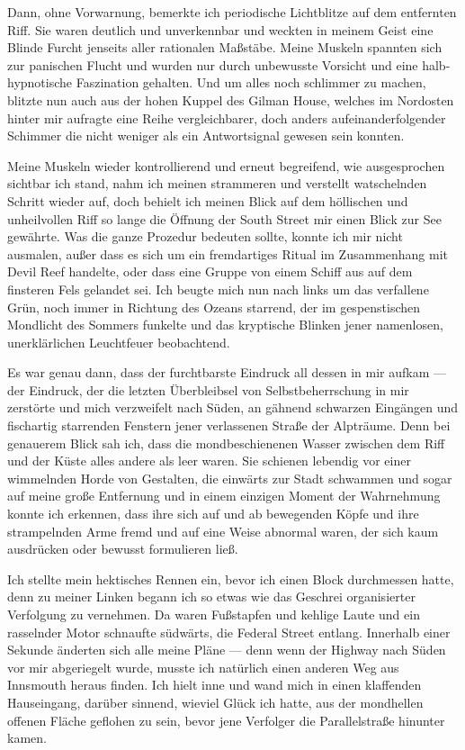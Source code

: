 Dann, ohne Vorwarnung, bemerkte ich periodische Lichtblitze auf dem entfernten Riff. Sie waren deutlich und unverkennbar und weckten in meinem Geist eine Blinde Furcht jenseits aller rationalen Maßstäbe. Meine Muskeln spannten sich zur panischen Flucht und wurden nur durch unbewusste Vorsicht und eine halb-hypnotische Faszination gehalten. Und um alles noch schlimmer zu machen, blitzte nun auch aus der hohen Kuppel des Gilman House, welches im Nordosten hinter mir aufragte eine Reihe vergleichbarer, doch anders aufeinanderfolgender Schimmer die nicht weniger als ein Antwortsignal gewesen sein konnten.

Meine Muskeln wieder kontrollierend und erneut begreifend, wie ausgesprochen sichtbar ich stand, nahm ich meinen strammeren und verstellt watschelnden Schritt wieder auf, doch behielt ich meinen Blick auf dem höllischen und unheilvollen Riff so lange die Öffnung der South Street mir einen Blick zur See gewährte. Was die ganze Prozedur bedeuten sollte, konnte ich mir nicht ausmalen, außer dass es sich um ein fremdartiges Ritual im Zusammenhang mit Devil Reef handelte, oder dass eine Gruppe von einem Schiff aus auf dem finsteren Fels gelandet sei. Ich beugte mich nun nach links um das verfallene Grün, noch immer in Richtung des Ozeans starrend, der im gespenstischen Mondlicht des Sommers funkelte und das kryptische Blinken jener namenlosen, unerklärlichen Leuchtfeuer beobachtend.

Es war genau dann, dass der furchtbarste Eindruck all dessen in mir aufkam --- der Eindruck, der die letzten Überbleibsel von Selbstbeherrschung in mir zerstörte und mich verzweifelt nach Süden, an gähnend schwarzen Eingängen und fischartig starrenden Fenstern jener verlassenen Straße der Alpträume. Denn bei genauerem Blick sah ich, dass die mondbeschienenen Wasser zwischen dem Riff und der Küste alles andere als leer waren. Sie schienen lebendig vor einer wimmelnden Horde von Gestalten, die einwärts zur Stadt schwammen und sogar auf meine große Entfernung und in einem einzigen Moment der Wahrnehmung konnte ich erkennen, dass ihre sich auf und ab bewegenden Köpfe und ihre strampelnden Arme fremd und auf eine Weise abnormal waren, der sich kaum ausdrücken oder bewusst formulieren ließ.

Ich stellte mein hektisches Rennen ein, bevor ich einen Block durchmessen hatte, denn zu meiner Linken begann ich so etwas wie das Geschrei organisierter Verfolgung zu vernehmen. Da waren Fußstapfen und kehlige Laute und ein rasselnder Motor schnaufte südwärts, die Federal Street entlang. Innerhalb einer Sekunde änderten sich alle meine Pläne --- denn wenn der Highway nach Süden vor mir abgeriegelt wurde, musste ich natürlich einen anderen Weg aus Innsmouth heraus finden. Ich hielt inne und wand mich in einen klaffenden Hauseingang, darüber sinnend, wieviel Glück ich hatte, aus der mondhellen offenen Fläche geflohen zu sein, bevor jene Verfolger die Parallelstraße hinunter kamen.

